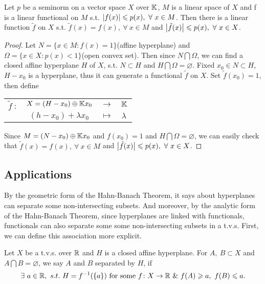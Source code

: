 \documentclass[a4paper,11pt]{report}
\begin{document}
\begin{thm}
	Let $p$ be a seminorm on a vector space $X$ over $\mathbb{K}$, $M$ is a linear space of $X$ and f is a linear functional on $M$ s.t. $\left\lvert f(x)\right\lvert \leqslant p(x),~ \forall~ x \in M$. Then there is a linear function $\tilde{f}$ on $X$ s.t. $\tilde{f}(x) = f(x),~ \forall~ x \in M$ and $\left\lvert\tilde{f}(x)\right\lvert \leqslant p(x),~ \forall~ x \in X$.
\end{thm}
\begin{proof}
	Let $N = \{x \in M \colon f(x) = 1\}$(affine hyperplane) and $\Omega = \{x \in X \colon  p(x) < 1\}$(open convex set). Then since $N \bigcap \Omega$, we can find a closed affine hyperplane $H$ of $X$, s.t. $N \subset H$ and $H \bigcap \Omega = \varnothing$. Fixed $x_0 \in N \subset H$, $H-x_0$ is a hyperplane, thus it can generate a functional $\tilde{f}$ on $X$. Set $\tilde{f}(x_0) = 1$, then define
	\begin{center}
		\begin{tabular}{l c c l}
			$\tilde{f}~\colon$ & $X=(H-x_0) \oplus \mathbb{K} x_0$ & $\longrightarrow$ & $\mathbb{K}$ \\
			$~$ & $(h-x_0)+\lambda x_0$ & $\longmapsto$ & $\lambda$
		\end{tabular}
	\end{center}
	Since $M = (N-x_0) \oplus \mathbb{K} x_0$ and $f(x_0) = 1$ and $H \bigcap \Omega = \varnothing$, we can easily check that $\tilde{f}(x) = f(x),~ \forall~ x \in M$ and $\left\lvert\tilde{f}(x)\right\lvert \leqslant p(x),~ \forall~ x \in X$.
\end{proof}

\subsection{Applications}
By the geometric form of the Hahn-Banach Theorem, it says about hyperplanes can separate some non-intersecting subsets. And moreover, by the analytic form of the Hahn-Banach Theorem, since hyperplanes are linked with functionals, functionals can also separate some some non-intersecting subsets in a t.v.s. First, we can define this association more explicit.

\begin{defn}
	Let $X$ be a t.v.s. over $\mathbb{R}$ and $H$ is a closed affine hyperplane. For $A,~B \subset X$ and $A \bigcap B = \varnothing$, we say $A$ and $B$ separated by $H$, if
	\begin{equation*}
		\exists~ a \in \mathbb{R},~ s.t.~ H = f^{-1}(\{a\}) \text{ for some } f \colon X \rightarrow \mathbb{R} ~\&~ f(A) \geqslant a,~ f(B) \leqslant  a.
	\end{equation*}
\end{defn}
 
\end{document}

